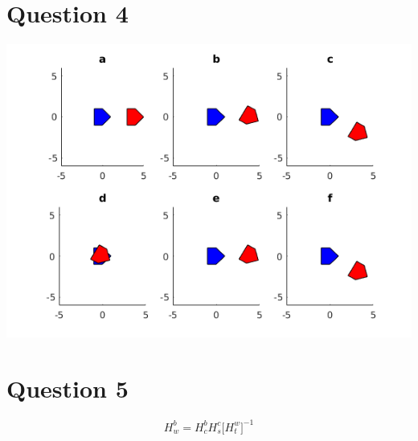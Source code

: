 \documentclass[11pt]{article}
\begin{document}
\section{Question 4}
\includegraphics{p4.png}
\section{Question 5}
$$
H^b_w =
H^b_c H^c_s \big[H^w_t \big]^{-1 }
$$
\end{document}
